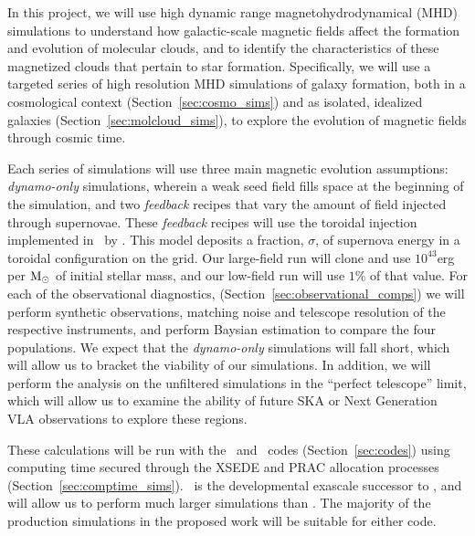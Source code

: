 
In this project, we will use high dynamic range magnetohydrodynamical
(MHD) simulations to understand how galactic-scale magnetic fields
affect the formation and evolution of molecular clouds, and to
identify the characteristics of these magnetized clouds that pertain
to star formation.  Specifically, we will use a targeted series of
high resolution MHD simulations of galaxy formation, both in a
cosmological context (Section~\ref{sec:cosmo_sims}) and as isolated, idealized
galaxies (Section~\ref{sec:molcloud_sims}), to explore the evolution
of magnetic fields through cosmic time.  

Each series of simulations will use
three main magnetic evolution assumptions: \emph{dynamo-only}  simulations,
wherein a weak seed field fills space at the beginning of the simulation, and
two \emph{feedback} recipes that vary the amount of field injected through
supernovae.  These \emph{feedback} recipes will use the toroidal injection
implemented in \enzo\ by \citet{Butsky17}.  This model deposits a fraction,
$\sigma$, of supernova energy in a toroidal configuration on the grid.  Our
large-field run will clone \citep{Butsky17} and use
 $10^{43}$erg per $\rm{M}_\odot$ of initial
stellar mass, and our low-field run will use $1\%$ of that value.  For each of
the observational diagnostics,
(Section~\ref{sec:observational_comps}) we will perform synthetic observations,
matching noise and telescope resolution of the respective instruments, and
perform Baysian estimation to compare the four populations.  We expect that the
\emph{dynamo-only} simulations will fall short, which will allow us to bracket
the viability of our simulations.  In addition, we will perform the analysis on
the unfiltered simulations in the ``perfect telescope'' limit, which will allow
us to examine the ability of future SKA or Next Generation VLA observations to
explore these regions.

These calculations will be run with the \enzo\ and \enzoe\ codes
(Section~\ref{sec:codes}) using computing time secured through the XSEDE and
PRAC allocation processes (Section~\ref{sec:comptime_sims}).  \enzoe\ is the
developmental exascale successor to \enzo, and will allow us to perform much
larger simulations than \enzo.  The majority of the production simulations in
the proposed work will be suitable for either code.  





